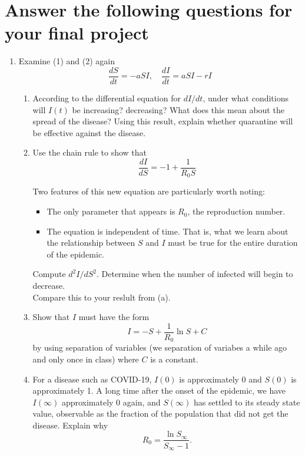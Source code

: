 \documentclass[10pt,letterpaper]{article}
\begin{document}
\section*{Answer the following questions for your final project}

\begin{enumerate}
\item Examine (1) and (2) again
\begin{equation*} 
\frac{dS}{dt} = -a S I, \quad \frac{dI}{dt} = a S I - r I 
\end{equation*}

\begin{enumerate}
\item According to the differential equation for $dI/dt$, under what conditions will $I(t)$ be increasing? decreasing? What does this mean about the spread of the disease? Using this result, explain whether quarantine will be effective against the disease.

\item Use the chain rule to show that 
\begin{equation}
\frac{dI}{dS}=-1+\frac{1}{R_0S}
\end{equation}

Two features of this new equation are particularly worth noting: 
\begin{itemize}
\item The only parameter that appears is $R_0$, the reproduction number.
\item The equation is independent of time. That is, what we learn about the relationship between $S$ and $I$ must be true for the entire duration of the epidemic.
\end{itemize}
Compute $d^2I/dS^2$. Determine when the number of infected will begin to decrease. \\
Compare this to your reslult from (a).

\item Show that $I$ must have the form 
\begin{equation}
I=-S+\frac{1}{R_0}\ln{S} + C
\end{equation}
by using separation of variables (we separation of variabes a while ago and only once in class) where $C$ is a constant.

\item For a disease such as COVID-19, $I(0)$ is approximately 0 and $S(0)$ is approximately 1. A long time after the onset of the epidemic, we have $I(\infty)$ approximately 0 again, and $S(\infty)$ has settled to its steady state value, observable as the fraction of the population that did not get the disease. Explain why $$R_0=\frac{\ln{S_\infty}}{S_\infty-1}.$$


\end{enumerate}
\end{enumerate}
\end{document}
